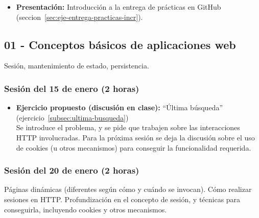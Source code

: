 \documentclass[a4paper,12pt]{article}
\begin{document}
\begin{itemize}
\item \textbf{Presentación:} Introducción a la entrega de prácticas en GitHub (seccion~\ref{sec:eje-entrega-practicas-incr}).
\end{itemize}


\subsection{01 - Conceptos básicos de aplicaciones web}

Sesión, mantenimiento de estado, persistencia.

\subsubsection{Sesión del 15 de enero (2 horas)}

\begin{itemize}
\item \textbf{Ejercicio propuesto (discusión en clase):} ``Última búsqueda'' (ejercicio~\ref{subsec:ultima-busqueda}) \\
  Se introduce el problema, y se pide que trabajen sobre las interacciones HTTP involucradas. Para la próxima sesión se deja la discusión sobre el uso de cookies (u otros mecanismos) para conseguir la funcionalidad requerida.
\end{itemize}

\subsubsection{Sesión del 20 de enero (2 horas)}

Páginas dinámicas (diferentes según cómo y cuándo se invocan). Cómo realizar sesiones en HTTP. Profundización en el concepto de sesión, y técnicas para conseguirla, incluyendo cookies y otros mecanismos.
\end{document}
